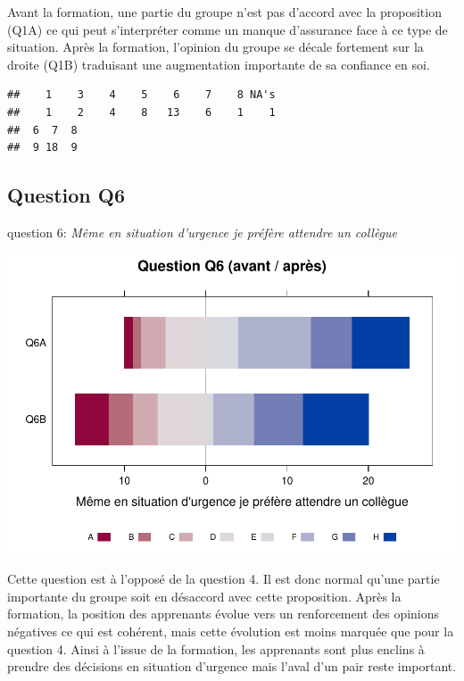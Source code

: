 \documentclass[12pt,english,french]{article}\usepackage{graphicx, color}
\makeatletter
\def\maxwidth{ %
  \ifdim\Gin@nat@width>\linewidth
    \linewidth
  \else
    \Gin@nat@width
  \fi
}
\newenvironment{kframe}{%
 \def\at@end@of@kframe{}%
 \ifinner\ifhmode%
  \def\at@end@of@kframe{\end{minipage}}%
  \begin{minipage}{\columnwidth}%
 \fi\fi%
 \def\FrameCommand##1{\hskip\@totalleftmargin \hskip-\fboxsep
 \colorbox{shadecolor}{##1}\hskip-\fboxsep
     \hskip-\linewidth \hskip-\@totalleftmargin \hskip\columnwidth}%
 \MakeFramed {\advance\hsize-\width
   \@totalleftmargin\z@ \linewidth\hsize
   \@setminipage}}%
 {\par\unskip\endMakeFramed%
 \at@end@of@kframe}
\newenvironment{knitrout}{}{} %
\makeatother
\begin{document}
Avant la formation, une partie du groupe n'est pas d'accord avec la proposition (Q1A) ce qui peut s'interpréter comme un manque d'assurance face à ce type de situation. Après la formation, l'opinion du groupe se décale fortement sur la droite (Q1B) traduisant une augmentation importante de sa confiance en soi.

\begin{knitrout}
\color{fgcolor}\begin{kframe}
\begin{verbatim}
##    1    3    4    5    6    7    8 NA's 
##    1    2    4    8   13    6    1    1
##  6  7  8 
##  9 18  9
\end{verbatim}
\end{kframe}
\end{knitrout}



\subsection{ Question Q6}
question 6: \emph{Même en situation d'urgence je préfère attendre un collègue}

\begin{knitrout}
\color{fgcolor}
\includegraphics[width=\maxwidth]{figure/q6} 

\end{knitrout}


Cette question est à l'opposé de la question 4. Il est donc normal qu'une partie importante du groupe soit en désaccord avec cette proposition. Après la formation, la position des apprenants évolue vers un renforcement des opinions négatives ce qui est cohérent, mais cette évolution est moins marquée que pour la question 4. Ainsi à l'issue de la formation, les apprenants sont plus enclins à prendre des décisions en situation d'urgence mais l'aval d'un pair reste important.
\end{document}
